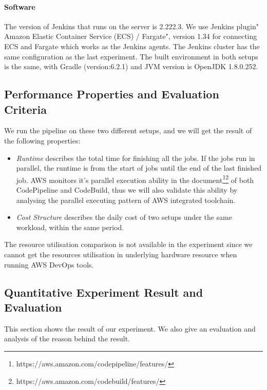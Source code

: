 \paragraph{Software}
The version of Jenkins that runs on the server is 2.222.3. We use Jenkins plugin" Amazon Elastic Container Service (ECS) / Fargate", version 1.34 for connecting ECS and Fargate which works as the Jenkins agents. The Jenkins cluster has the same configuration as the last experiment. The built environment in both setups is the same, with Gradle (version:6.2.1) and JVM version is OpenJDK 1.8.0.252.
\subsection{Performance Properties and Evaluation Criteria}
We run the pipeline on these two different setups, and we will get the result of the following properties:
\begin{itemize}
\item \textit{Runtime} describes the total time for finishing all the jobs. If the jobs run in parallel, the runtime is from the start of jobs until the end of the last finished job. AWS monitors it's parallel execution ability in the document\footnote{https://aws.amazon.com/codepipeline/features/}\footnote{https://aws.amazon.com/codebuild/features/} of both CodePipeline and CodeBuild, thus we will also validate this ability by analysing the parallel executing pattern of AWS integrated toolchain. \label{aws_parallel}
\item \textit{Cost Structure} describes the daily cost of two setups under the same workload, within the same period.
\end{itemize}
The resource utilisation comparison is not available in the experiment since we cannot get the resources utilisation in underlying hardware resource when running AWS DevOps tools.
\subsection{Quantitative Experiment Result and Evaluation}
This section shows the result of our experiment. We also give an evaluation and analysis of the reason behind the result.
